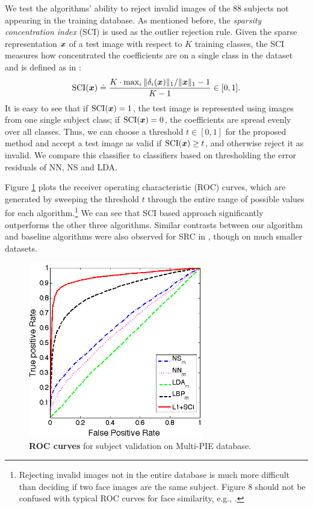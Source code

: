 \documentclass[12pt,journal,draftcls,letterpaper,onecolumn]{IEEEtran}
\begin{document}
We test the algorithms' ability to reject invalid images of the
88 subjects not appearing in the training database. As
mentioned before, the \emph{sparsity concentration index} (SCI)
is used as the outlier rejection rule. Given the sparse
representation ${\boldsymbol{x}}$ of a test image with respect to $K$
training classes, the SCI measures how concentrated the
coefficients are on a single class in the dataset and is
defined as in \cite{Wright2009-PAMI}:
\begin{displaymath}
\textup{SCI}({\boldsymbol{x}}) \doteq \frac{K \cdot \max_i \|\delta_i({\boldsymbol{x}})\|_1 /
\|{\boldsymbol{x}}\|_1 - 1}{K - 1} \in [0,1] .
\end{displaymath}
It is easy to see that if $\textup{SCI}({\boldsymbol{x}}) = 1$, the test
image is represented using images from one single subject
class; if $\textup{SCI}({\boldsymbol{x}}) = 0$, the coefficients are spread
evenly over all classes. Thus, we can choose a threshold $t \in
[0,1]$ for the proposed method and accept a test image as valid
if $\textup{SCI}({\boldsymbol{x}}) \geq t$, and otherwise reject it as
invalid. We compare this classifier to classifiers based on
thresholding the error residuals of NN, NS and LDA.

Figure \ref{fig:roc-multipie} plots the receiver operating
characteristic (ROC) curves, which are generated by sweeping
the threshold $t$ through the entire range of possible values
for each algorithm.\footnote{Rejecting invalid images not in
the entire database is much more difficult than deciding if two
face images are the same subject. Figure 8 should not be
confused with typical ROC curves for face similarity, e.g.,
\cite{PhillipsP2007}.} We can see that SCI based approach
significantly outperforms the other three algorithms. Similar
contrasts between our algorithm and baseline algorithms were
also observed for SRC in \cite{Wright2009-PAMI}, though on much
smaller datasets.

\begin{figure}
\centerline{
\includegraphics[width=3in]{figures_pami/pami_roc2.png}
}
\caption{{\bf ROC curves} for subject validation on Multi-PIE database.}\label{fig:roc-multipie}
\end{figure}
\end{document}
